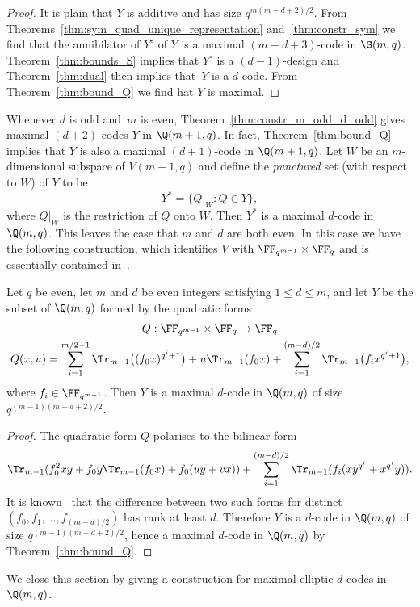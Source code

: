 \begin{proof}
It is plain that $Y$ is additive and has size $q^{m(m-d+2)/2}$. From Theorems~\ref{thm:sym_quad_unique_representation} and~\ref{thm:constr_sym} we find that the annihilator of $Y^\circ$ of $Y$ is a maximal $(m-d+3)$-code in $\S(m,q)$. Theorem~\ref{thm:bounds_S} implies that $Y^\circ$ is a $(d-1)$-design and Theorem~\ref{thm:dual} then implies that~$Y$ is a $d$-code. From Theorem~\ref{thm:bound_Q} we find hat $Y$ is maximal.
\end{proof}
\par
Whenever $d$ is odd and~$m$ is even, Theorem~\ref{thm:constr_m_odd_d_odd} gives maximal $(d+2)$-codes $Y$ in $\Q(m+1,q)$. In fact, Theorem~\ref{thm:bound_Q} implies that $Y$ is also a maximal $(d+1)$-code in $\Q(m+1,q)$. Let $W$ be an $m$-dimensional subspace of $V(m+1,q)$ and define the \emph{punctured} set (with respect to $W$) of $Y$ to be
\[
Y^*=\big\{Q|_W:Q\in Y\big\},
\]
where $Q|_W$ is the restriction of $Q$ onto $W$. Then $Y^*$ is a maximal $d$-code in $\Q(m,q)$. This leaves the case that $m$ and $d$ are both even. In this case we have the following construction, which identifies $V$ with $\FF_{q^{m-1}}\times\FF_q$ and is essentially contained in~\cite{DelGoe1975}.
\begin{theorem}
\label{thm:constr_elliptic_codes}
Let $q$ be even, let $m$ and $d$ be even integers satisfying $1\le d\le m$, and let $Y$ be the subset of $\Q(m,q)$ formed by the quadratic forms
\begin{gather*}
Q:\FF_{q^{m-1}}\times\FF_q\to\FF_q\\
Q(x,u)=\sum_{i=1}^{m/2-1}\Tr_{m-1}\big((f_0x)^{q^i+1}\big)+u\Tr_{m-1}(f_0x)+\sum_{i=1}^{(m-d)/2}\Tr_{m-1}\big(f_ix^{q^i+1}\big),
\end{gather*}
where $f_i\in\FF_{q^{m-1}}$. Then $Y$ is a maximal $d$-code in $\Q(m,q)$ of size $q^{(m-1)(m-d+2)/2}$.
\end{theorem}
\begin{proof}
The quadratic form $Q$ polarises to the bilinear form
\[
\Tr_{m-1}(f_0^2xy+f_0y\Tr_{m-1}(f_0x)+f_0(uy+vx))+\sum_{i=1}^{(m-d)/2}\Tr_{m-1}(f_i(xy^{q^i}+x^{q^i}y)).
\]
It is known~\cite[Theorem~9]{DelGoe1975} that the difference between two such forms for distinct $(f_0,f_1,\dots,f_{(m-d)/2})$ has rank at least $d$. Therefore $Y$ is a $d$-code in $\Q(m,q)$ of size $q^{(m-1)(m-d+2)/2}$, hence a maximal $d$-code in $\Q(m,q)$ by Theorem~\ref{thm:bound_Q}.
\end{proof}
\par
We close this section by giving a construction for maximal elliptic $d$-codes in~$\Q(m,q)$.
